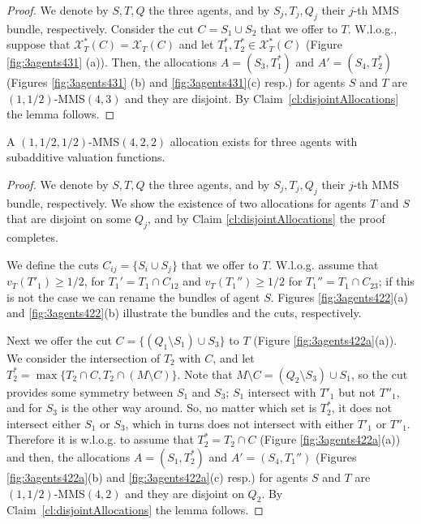 \begin{proof}
    We denote by $S,T,Q$ the three agents, and by $S_j,T_j,Q_j$ their $j$-th MMS bundle, respectively. Consider the cut $C={S_1\cup S_2}$ that we offer to $T$. W.l.o.g., suppose that
    $\mathcal{X}^*_T(C)=\mathcal{X}_T(C)$ and let $T_1^*,T_2^* \in \mathcal{X}^*_T(C)$ (Figure \ref{fig:3agents431} (a)). 
    Then, the allocations $A=(S_3,T_1^*)$ and  $A'=(S_4,T_2^*)$ (Figures \ref{fig:3agents431} (b) and \ref{fig:3agents431}(c) resp.) for agents $S$ and $T$ are $(1,1/2)$-MMS$(4,3)$ and they are disjoint. By Claim~\ref{cl:disjointAllocations} the lemma follows.
\end{proof}

\begin{lemma} \label{lemma:3Agents4}
A $(1,1/2,1/2)$-MMS$(4,2,2)$ allocation exists for three agents with subadditive valuation functions. 
\end{lemma}
\begin{proof}
We denote by $S,T,Q$ the three agents, and by $S_j,T_j,Q_j$ their $j$-th MMS bundle, respectively. We show the existence of two allocations for agents $T$ and $S$ that are disjoint on some $Q_j$,   and by Claim \ref{cl:disjointAllocations} the proof completes. 

We define the cuts $C_{ij}=\{S_i \cup S_j\}$ that we offer to $T$. W.l.o.g. assume that $v_T(T'_1)\geq 1/2$, for $T_1' =T_1\cap  C_{12}$ and $v_T(T_1'')\geq 1/2$ for $T_1''=T_1 \cap C_{23}$; if this is not the case we can rename the bundles of agent $S$.  Figures \ref{fig:3agents422}(a) and \ref{fig:3agents422}(b) illustrate the bundles and the cuts, respectively. 


Next we offer the cut $C=\{(Q_1 \setminus S_1) \cup S_3\}$ to $T$ (Figure \ref{fig:3agents422a}(a)). We consider the intersection of $T_2$ with $C$, and let $T_2^*=\max\{T_2\cap C, T_2\cap (M\setminus C)\}$. Note that $M\setminus C = (Q_2 \setminus S_3) \cup S_1$, so the cut provides some symmetry between $S_1$ and $S_3$; $S_1$ intersect with $T'_1$ but not $T''_1$, and for $S_3$ is the other way around. So, no matter which set is $T_2^*$, it does not intersect either $S_1$ or $S_3$, which in turns does not intersect with either $T'_1$ or $T''_1$. Therefore it is w.l.o.g. to assume that $T_2^*=T_2\cap C$ (Figure \ref{fig:3agents422a}(a)) and then, the allocations $A=(S_1,T_2^*)$ and  $A'=(S_4,T_1'')$ (Figures \ref{fig:3agents422a}(b) and \ref{fig:3agents422a}(c) resp.) for agents $S$ and $T$ are $(1,1/2)$-MMS$(4,2)$ and they are disjoint on $Q_2$. By Claim~\ref{cl:disjointAllocations} the lemma follows.
\end{proof}

